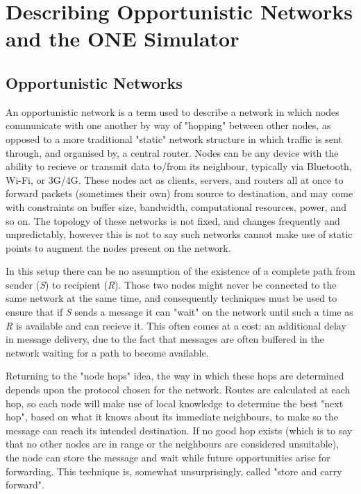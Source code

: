 \documentclass[12pt]{report}
\begin{document}
\maketitle
\tableofcontents
\pagebreak

\section{Describing Opportunistic Networks and the ONE Simulator}
\subsection{Opportunistic Networks}

An opportunistic network is a term used to describe a network in which nodes communicate with one another by way of "hopping" between other nodes, as opposed to a more traditional "static" network structure in which traffic is sent through, and organised by, a central router.
Nodes can be any device with the ability to recieve or transmit data to/from its neighbour, typically via Bluetooth, Wi-Fi, or 3G/4G.
These nodes act as clients, servers, and routers all at once to forward packets (sometimes their own) from source to destination, and may come with constraints on buffer size, bandwidth, computational resources, power, and so on.
The topology of these networks is not fixed, and changes frequently and unpredictably, however this is not to say such networks cannot make use of static points to augment the nodes present on the network.

\par

In this setup there can be no assumption of the existence of a complete path from sender (\textit{S}) to recipient (\textit{R}).
Those two nodes might never be connected to the same network at the same time, and consequently techniques must be used to ensure that if \textit{S} sends a message it can "wait" on the network until such a time as \textit{R} is available and can recieve it.
This often comes at a cost: an additional delay in message delivery, due to the fact that messages are often buffered in the network waiting for a path to become available.

\par

Returning to the "node hops" idea, the way in which these hops are determined depends upon the protocol chosen for the network.
Routes are calculated at each hop, so each node will make use of local knowledge to determine the best "next hop", based on what it knows about its immediate neighbours, to make so the message can reach its intended destination.
If no good hop exists (which is to say that no other nodes are in range or the neighbours are considered unsuitable), the node can store the message and wait while future opportunities arise for forwarding.
This technique is, somewhat unsurprisingly, called "store and carry forward".
\end{document}
